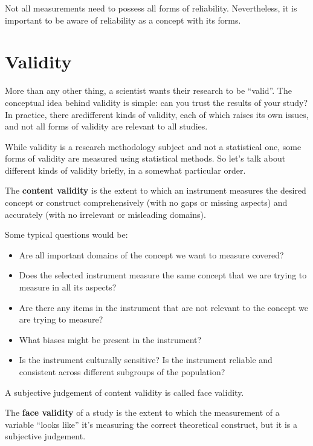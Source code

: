 \documentclass[
  11pt,
  a4paper,
  twoside,symmetric,openright]{book}
\providecommand{\tightlist}{%
  \setlength{\itemsep}{0pt}\setlength{\parskip}{0pt}}
\theoremstyle{break}
\theoremstyle{break}
\begin{document}
Not all measurements need to possess all forms of reliability. Nevertheless, it is important to be aware of reliability as a concept with its forms.

\hypertarget{validity}{%
\section{Validity}\label{validity}}

More than any other thing, a scientist wants their research to be ``valid''. The conceptual idea behind validity is simple: can you trust the results of your study? In practice, there aredifferent kinds of validity, each of which raises its own issues, and not all forms of validity are relevant to all studies.

While validity is a research methodology subject and not a statistical one, some forms of validity are measured using statistical methods. So let's talk about different kinds of validity briefly, in a somewhat particular order.

\begin{definition}
\protect\hypertarget{def:defcontentvalidity}{}\label{def:defcontentvalidity}The \textbf{content validity} is the extent to which an instrument measures the desired concept or construct comprehensively (with no gaps or missing aspects) and accurately (with no irrelevant or misleading domains).
\end{definition}

Some typical questions would be:

\begin{itemize}
\tightlist
\item
  Are all important domains of the concept we want to measure covered?
\item
  Does the selected instrument measure the same concept that we are trying to measure in all its aspects?
\item
  Are there any items in the instrument that are not relevant to the concept we are trying to measure?
\item
  What biases might be present in the instrument?
\item
  Is the instrument culturally sensitive? Is the instrument reliable and consistent across different subgroups of the population?
\end{itemize}

A subjective judgement of content validity is called face validity.

\begin{definition}
\protect\hypertarget{def:deffacevalidity}{}\label{def:deffacevalidity}The \textbf{face validity} of a study is the extent to which the measurement of a variable ``looks like'' it's measuring the correct theoretical construct, but it is a subjective judgement.
\end{definition}
\end{document}
